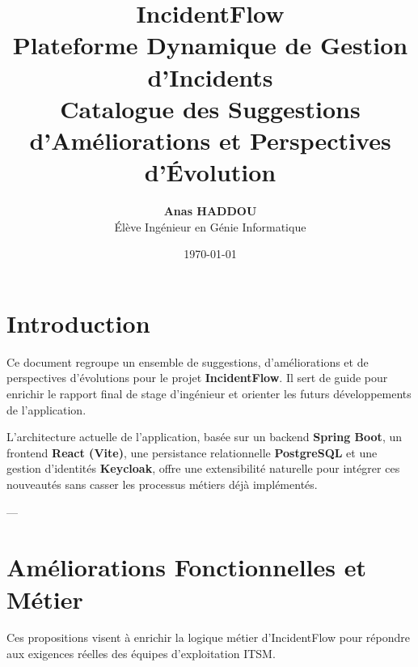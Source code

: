 \documentclass[12pt,a4paper]{article}
\title{
    \vspace{1cm}
    \textbf{\Huge IncidentFlow}\\[0.5cm]
    \Large Plateforme Dynamique de Gestion d'Incidents\\[1.5cm]
    \textbf{\Large Catalogue des Suggestions d'Améliorations et Perspectives d'Évolution}
    \vspace{1.5cm}
}
\author{\textbf{Anas HADDOU} \\ Élève Ingénieur en Génie Informatique}
\date{\today}
\begin{document}
\maketitle
\thispagestyle{empty}
\clearpage

\tableofcontents
\clearpage

\section{Introduction}
Ce document regroupe un ensemble de suggestions, d'améliorations et de perspectives d'évolutions pour le projet \textbf{IncidentFlow}. Il sert de guide pour enrichir le rapport final de stage d'ingénieur et orienter les futurs développements de l'application. 

L'architecture actuelle de l'application, basée sur un backend \textbf{Spring Boot}, un frontend \textbf{React (Vite)}, une persistance relationnelle \textbf{PostgreSQL} et une gestion d'identités \textbf{Keycloak}, offre une extensibilité naturelle pour intégrer ces nouveautés sans casser les processus métiers déjà implémentés.

---

\section{Améliorations Fonctionnelles et Métier}
Ces propositions visent à enrichir la logique métier d'IncidentFlow pour répondre aux exigences réelles des équipes d'exploitation ITSM.
\end{document}
